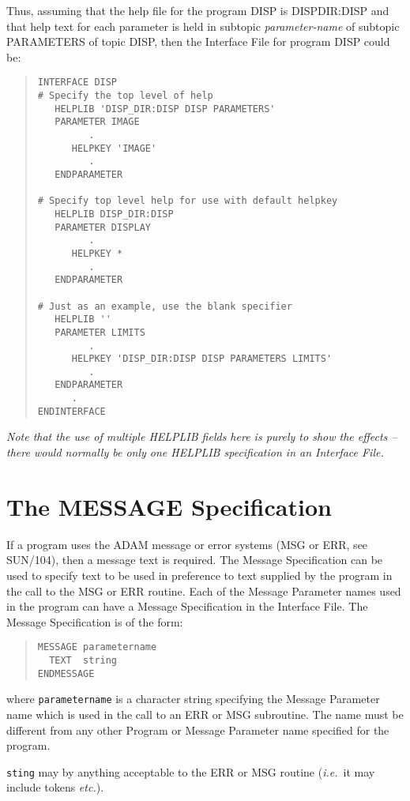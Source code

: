 \documentclass[twoside,11pt]{article}
\newcommand{\xref}[3]{#1}
\newcommand{\xlabel}[1]{}
\renewcommand{\_}{\texttt{\symbol{95}}}
\begin{document}
Thus, assuming that the help file for the program DISP is 
DISP\_DIR:DISP and that help text for each parameter is held in subtopic
{\em parameter-name} of subtopic PARAMETERS of topic DISP, then
the Interface File for program DISP could be:
\begin{quote} \begin{verbatim}
INTERFACE DISP
# Specify the top level of help
   HELPLIB 'DISP_DIR:DISP DISP PARAMETERS'
   PARAMETER IMAGE
         .
      HELPKEY 'IMAGE'
         .
   ENDPARAMETER

# Specify top level help for use with default helpkey
   HELPLIB DISP_DIR:DISP
   PARAMETER DISPLAY
         .
      HELPKEY *
         .
   ENDPARAMETER

# Just as an example, use the blank specifier
   HELPLIB ''
   PARAMETER LIMITS
         .
      HELPKEY 'DISP_DIR:DISP DISP PARAMETERS LIMITS'
         .
   ENDPARAMETER
      .
ENDINTERFACE
\end{verbatim} \end{quote}
{\em Note that the use of multiple HELPLIB fields here is purely to show the
effects -- there would normally be only one HELPLIB specification in
an Interface File.}

\section{The MESSAGE Specification\xlabel{the_message_specification}}

If a program uses the ADAM message or error systems (MSG or ERR, see
\xref{SUN/104}{sun104}{}), then a message text is required. 
The Message Specification can be used to specify text to be used in preference
to text supplied by the program in the call to the MSG or ERR routine.
Each of the Message Parameter names used in the program can have
a Message Specification in the Interface File. The Message Specification
is of the form: 
\begin{quote} \begin{verbatim}
MESSAGE parametername
  TEXT  string
ENDMESSAGE
\end{verbatim} \end{quote}
where \texttt{parametername} is a character string specifying the Message 
Parameter name which is used in the call to an ERR or MSG subroutine.
The name must be different from any other Program or Message Parameter name
specified for the program.

\texttt{sting} may by anything acceptable to the ERR or MSG routine 
({\em i.e.}\ it may include tokens {\em etc.}).
\end{document}
